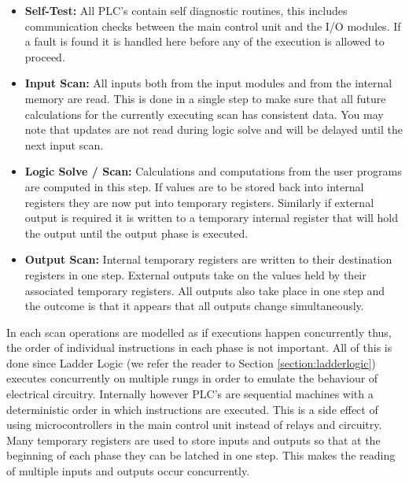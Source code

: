 \begin{itemize}
	\item\textbf{Self-Test:} All PLC's contain self diagnostic routines, this includes communication checks between the main control unit and the I/O modules. If a fault is found it is handled here before any of the execution is allowed to proceed.
	\item\textbf{Input Scan:} All inputs both from the input modules and from the internal memory are read. This is done in a single step to make sure that all future calculations for the currently executing scan has consistent data. You may note that updates are not read during logic solve and will be delayed until the next input scan.
	\item\textbf{Logic Solve / Scan:} Calculations and computations from the user programs are computed in this step. If values are to be stored back into internal registers they are now put into temporary registers. Similarly if external output is required it is written to a temporary internal register that will hold the output until the output phase is executed.
	\item\textbf{Output Scan:} Internal temporary registers are written to their destination registers in one step. External outputs take on the values held by their associated temporary registers. All outputs also take place in one step and the outcome is that it appears that all outputs change simultaneously.
\end{itemize}

In each scan operations are modelled as if executions happen concurrently thus, the order of individual instructions in each phase is not important. All of this is done since Ladder Logic (we refer the reader to Section \ref{section:ladderlogic}) executes concurrently on multiple rungs in order to emulate the behaviour of electrical circuitry. Internally however PLC's are sequential machines with a deterministic order in which instructions are executed. This is a side effect of using microcontrollers in the main control unit instead of relays and circuitry. Many temporary registers are used to store inputs and outputs so that at the beginning of each phase they can be latched in one step. This makes the reading of multiple inputs and outputs occur concurrently.

